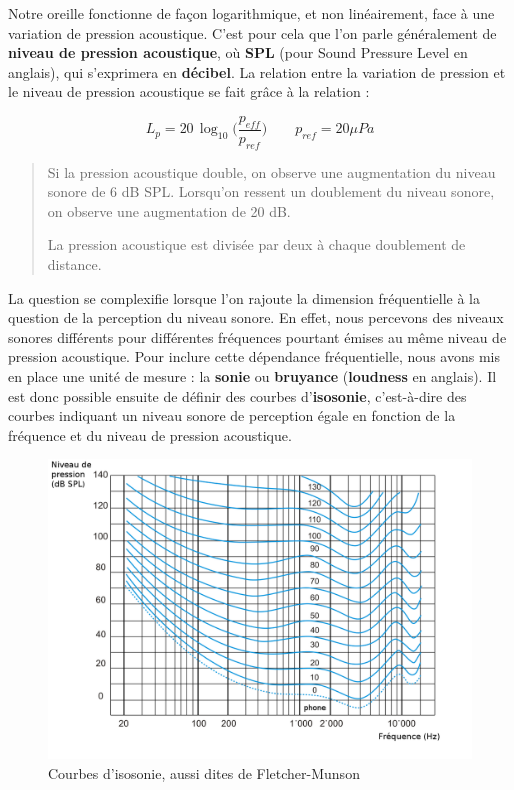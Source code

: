 \documentclass[
  letterpaper,
  DIV=11,
  numbers=noendperiod]{scrreprt}
\begin{document}
Notre oreille fonctionne de façon logarithmique, et non linéairement,
face à une variation de pression acoustique. C'est pour cela que l'on
parle généralement de \textbf{niveau de pression acoustique}, où
\textbf{SPL} (pour Sound Pressure Level en anglais), qui s'exprimera en
\textbf{décibel}. La relation entre la variation de pression et le
niveau de pression acoustique se fait grâce à la relation :

\[L_p = 20\,\log_{10}\Big(\frac{p_{eff}}{p_{ref}}\Big) \qquad p_{ref} = 20\mu Pa\]

\begin{quote}
Si la pression acoustique double, on observe une augmentation du niveau
sonore de 6 dB SPL. Lorsqu'on ressent un doublement du niveau sonore, on
observe une augmentation de 20 dB.

La pression acoustique est divisée par deux à chaque doublement de
distance.
\end{quote}

La question se complexifie lorsque l'on rajoute la dimension
fréquentielle à la question de la perception du niveau sonore. En effet,
nous percevons des niveaux sonores différents pour différentes
fréquences pourtant émises au même niveau de pression acoustique. Pour
inclure cette dépendance fréquentielle, nous avons mis en place une
unité de mesure : la \textbf{sonie} ou \textbf{bruyance}
(\textbf{loudness} en anglais). Il est donc possible ensuite de définir
des courbes d'\textbf{isosonie}, c'est-à-dire des courbes indiquant un
niveau sonore de perception égale en fonction de la fréquence et du
niveau de pression acoustique.

\begin{figure}

{\centering \includegraphics{generalites/../_resources/diagrams/Courbes_isosonie.png}

}

\caption{\label{fig-isosonie}Courbes d'isosonie, aussi dites de
Fletcher-Munson}

\end{figure}
\end{document}
